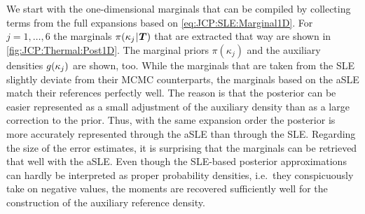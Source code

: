 We start with the one-dimensional marginals that can be compiled by collecting terms from the full expansions based on \cref{eq:JCP:SLE:Marginal1D}.
For \(j = 1,\ldots,6\) the marginals \(\pi(\kappa_j {\:\!}|{\:\!} \bm{T})\) that are extracted that way are shown in \cref{fig:JCP:Thermal:Post1D}.
The marginal priors \(\pi(\kappa_j)\) and the auxiliary densities \(g(\kappa_j)\) are shown, too.
While the marginals that are taken from the SLE slightly deviate from their MCMC counterparts, the marginals based on the aSLE match their references perfectly well.
The reason is that the posterior can be easier represented as a small adjustment of the auxiliary density than as a large correction to the prior.
Thus, with the same expansion order the posterior is more accurately represented through the aSLE than through the SLE.
Regarding the size of the error estimates, it is surprising that the marginals can be retrieved that well with the aSLE.
Even though the SLE-based posterior approximations can hardly be interpreted as proper probability densities, i.e.\ they conspicuously take on negative values,
the moments are recovered sufficiently well for the construction of the auxiliary reference density.
